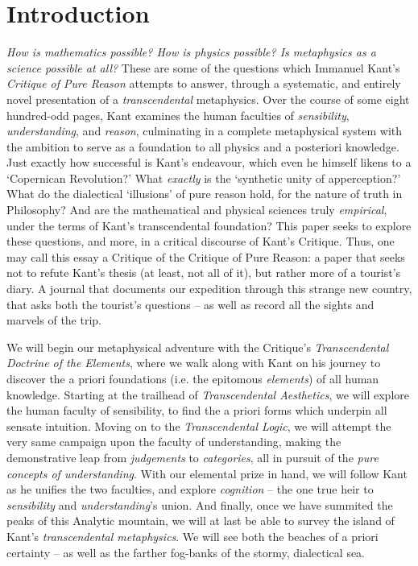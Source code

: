 \section*{Introduction}
\emph{How is mathematics possible? How is physics possible? Is metaphysics as a science possible at all?} These are some of the questions which Immanuel Kant's \emph{Critique of Pure Reason} attempts to answer, through a systematic, and entirely novel presentation of a \emph{transcendental} metaphysics. Over the course of some eight hundred-odd pages, Kant examines the human faculties of \emph{sensibility}, \emph{understanding}, and \emph{reason}, culminating in a complete metaphysical system with the ambition to serve as a foundation to all physics and a posteriori knowledge. Just exactly how successful is Kant's endeavour, which even he himself likens to a `Copernican Revolution?' What \emph{exactly} is the `synthetic unity of apperception?' What do the dialectical `illusions' of pure reason hold, for the nature of truth in Philosophy? And are the mathematical and physical sciences truly \emph{empirical}, under the terms of Kant's transcendental foundation? This paper seeks to explore these questions, and more, in a critical discourse of Kant's Critique. Thus, one may call this essay a Critique of the Critique of Pure Reason: a paper that seeks not to refute Kant's thesis (at least, not all of it), but rather more of a tourist's diary. A journal that documents our expedition through this strange new country, that asks both the tourist's questions -- as well as record all the sights and marvels of the trip.

We will begin our metaphysical adventure with the Critique's \emph{Transcendental Doctrine of the Elements}, where we walk along with Kant on his journey to discover the a priori foundations (i.e. the epitomous \emph{elements}) of all human knowledge. Starting at the trailhead of \emph{Transcendental Aesthetics}, we will explore the human faculty of sensibility, to find the a priori forms which underpin all sensate intuition. Moving on to the \emph{Transcendental Logic}, we will attempt the very same campaign upon the faculty of understanding, making the demonstrative leap from \emph{judgements} to \emph{categories}, all in pursuit of the \emph{pure concepts of understanding}. With our elemental prize in hand, we will follow Kant as he unifies the two faculties, and explore \emph{cognition} -- the one true heir to \emph{sensibility} and \emph{understanding}'s union. And finally, once we have summited the peaks of this Analytic mountain, we will at last be able to survey the island of Kant's \emph{transcendental metaphysics}. We will see both the beaches of a priori certainty -- as well as the farther fog-banks of the stormy, dialectical sea.
